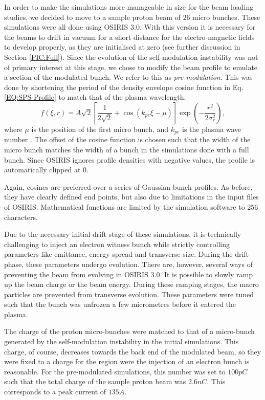 In order to make the simulations more manageable in size for the beam loading studies, we decided to move to a sample proton beam of $26$ micro bunches.
These simulations were all done using OSIRIS 3.0.
With this version it is necessary for the beams to drift in vacuum for a short distance for the electro-magnetic fields to develop properly, as they are initialised at zero (see further discussion in Section \ref{PIC:Full}).
Since the evolution of the self-modulation instability was not of primary interest at this stage, we chose to modify the beam profile to emulate a section of the modulated bunch.
We refer to this as \textit{pre-modulation}.
This was done by shortening the period of the density envelope cosine function in Eq. \ref{EQ:SPS-Profile} to match that of the plasma wavelength.
\begin{equation}
    f(\xi,r) = A\sqrt{2} \left[\frac{1}{2\sqrt{2}}
             + \cos\left(k_{pe}\xi - \mu\right)\right] \exp\left(-\frac{r^{2}}{2\sigma_{r}^{2}}\right), \label{EQ:PB-PreMod}
\end{equation}
where $\mu$ is the position of the first micro bunch, and $k_{pe}$ is the plasma wave number \cite{berglyd_olsen:2015}.
The offset of the cosine function is chosen such that the width of the micro bunch matches the width of a bunch in the simulations done with a full bunch.
Since OSIRIS ignores profile densities with negative values, the profile is automatically clipped at $0$.

Again, cosines are preferred over a series of Gaussian bunch profiles.
As before, they have clearly defined end points, but also due to limitations in the input files of OSIRIS.
Mathematical functions are limited by the simulation software to $256$ characters.


Due to the necessary initial drift stage of these simulations, it is technically challenging to inject an electron witness bunch while strictly controlling parameters like emittance, energy spread and transverse size.
During the drift phase, these parameters undergo evolution.
There are, however, several ways of preventing the beam from evolving in OSIRIS 3.0.
It is possible to slowly ramp up the beam charge or the beam energy.
During these ramping stages, the macro particles are prevented from transverse evolution.
These parameters were tuned such that the bunch was unfrozen a few micrometres before it entered the plasma.

The charge of the proton micro-bunches were matched to that of a micro-bunch generated by the self-modulation instability in the initial simulations.
This charge, of course, decreases towards the back end of the modulated beam, so they were fixed to a charge for the region were the injection of an electron bunch is reasonable.
For the pre-modulated simulations, this number was set to $100\unit{pC}$ such that the total charge of the sample proton beam was $2.6\unit{nC}$.
This corresponds to a peak current of $135\unit{A}$.

